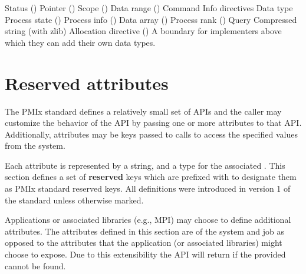 \begin{constantdesc}

%
Status ()
%
Pointer ()
%
Scope ()
%
Data range ()
%
Command
%
Info directives
%
Data type
%
Process state ()
%
Process info ()
%
Data array ()
%
Process rank ()
%
Query
%
Compressed string (with zlib)
%
Allocation directive ()
%
A boundary for implementers above which they can add their own data types.
%
\end{constantdesc}


\section{Reserved attributes}
\label{api:struct:attributes}

The PMIx standard defines a relatively small set of APIs and the caller may customize the behavior of the API by passing one or more attributes to that API.
Additionally, attributes may be keys passed to  calls to access the specified values from the system.

Each attribute is represented by a  string, and a type for the associated .
This section defines a set of \textbf{reserved} keys which are prefixed with  to designate them as PMIx standard reserved keys. All definitions were introduced in version 1 of the standard unless otherwise marked.

Applications or associated libraries (e.g., \ac{MPI}) may choose to define additional attributes.
The attributes defined in this section are of the system and job as opposed to the attributes that the application (or associated libraries) might choose to expose.
Due to this extensibility the  API will return  if the provided  cannot be found.

